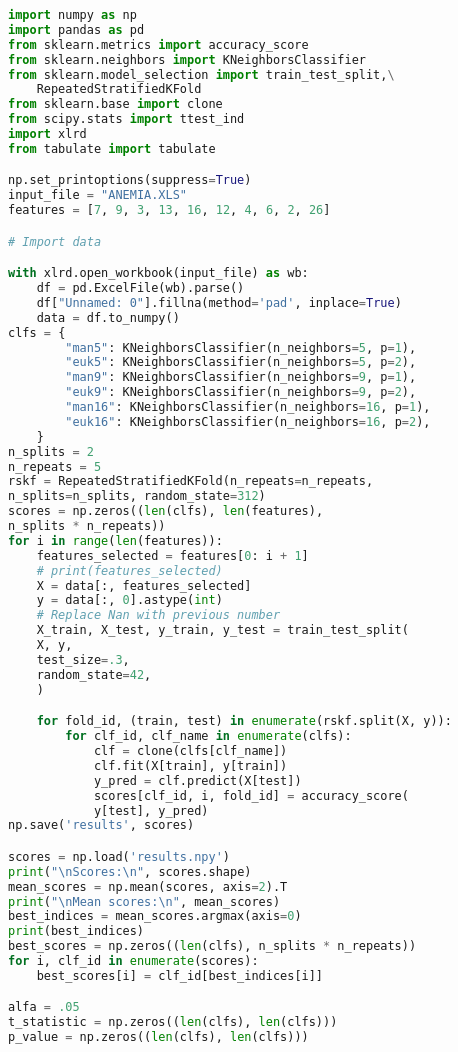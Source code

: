 \documentclass[runningheads]{llncs}
\begin{document}
\begin{lstlisting}[language=Python]
import numpy as np
import pandas as pd
from sklearn.metrics import accuracy_score
from sklearn.neighbors import KNeighborsClassifier
from sklearn.model_selection import train_test_split,\
    RepeatedStratifiedKFold
from sklearn.base import clone
from scipy.stats import ttest_ind
import xlrd
from tabulate import tabulate

np.set_printoptions(suppress=True)
input_file = "ANEMIA.XLS"
features = [7, 9, 3, 13, 16, 12, 4, 6, 2, 26]

# Import data

with xlrd.open_workbook(input_file) as wb:
    df = pd.ExcelFile(wb).parse()
    df["Unnamed: 0"].fillna(method='pad', inplace=True)
    data = df.to_numpy()
clfs = {
        "man5": KNeighborsClassifier(n_neighbors=5, p=1),
        "euk5": KNeighborsClassifier(n_neighbors=5, p=2),
        "man9": KNeighborsClassifier(n_neighbors=9, p=1),
        "euk9": KNeighborsClassifier(n_neighbors=9, p=2),
        "man16": KNeighborsClassifier(n_neighbors=16, p=1),
        "euk16": KNeighborsClassifier(n_neighbors=16, p=2),
    }
n_splits = 2
n_repeats = 5
rskf = RepeatedStratifiedKFold(n_repeats=n_repeats,
n_splits=n_splits, random_state=312)
scores = np.zeros((len(clfs), len(features),
n_splits * n_repeats))
for i in range(len(features)):
    features_selected = features[0: i + 1]
    # print(features_selected)
    X = data[:, features_selected]
    y = data[:, 0].astype(int)
    # Replace Nan with previous number
    X_train, X_test, y_train, y_test = train_test_split(
    X, y,
    test_size=.3,
    random_state=42,
    )

    for fold_id, (train, test) in enumerate(rskf.split(X, y)):
        for clf_id, clf_name in enumerate(clfs):
            clf = clone(clfs[clf_name])
            clf.fit(X[train], y[train])
            y_pred = clf.predict(X[test])
            scores[clf_id, i, fold_id] = accuracy_score(
            y[test], y_pred)
np.save('results', scores)

scores = np.load('results.npy')
print("\nScores:\n", scores.shape)
mean_scores = np.mean(scores, axis=2).T
print("\nMean scores:\n", mean_scores)
best_indices = mean_scores.argmax(axis=0)
print(best_indices)
best_scores = np.zeros((len(clfs), n_splits * n_repeats))
for i, clf_id in enumerate(scores):
    best_scores[i] = clf_id[best_indices[i]]

alfa = .05
t_statistic = np.zeros((len(clfs), len(clfs)))
p_value = np.zeros((len(clfs), len(clfs)))


\end{lstlisting}
\end{document}
